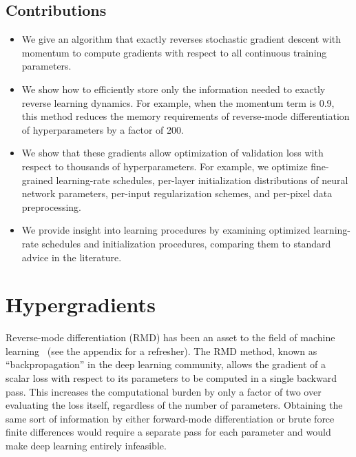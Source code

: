 \documentclass{article}
\begin{document}
\subsection{Contributions}

\begin{itemize}
\item We give an algorithm that exactly reverses stochastic gradient descent with momentum to compute gradients with respect to all continuous training parameters.
\item We show how to efficiently store only the information needed to exactly reverse learning dynamics.
For example, when the momentum term is 0.9, this method reduces the memory requirements of reverse-mode differentiation of hyperparameters by a factor of 200.
\item We show that these gradients allow optimization of validation loss with respect to thousands of hyperparameters.
For example, we optimize fine-grained learning-rate schedules, per-layer initialization distributions of neural network parameters, per-input regularization schemes, and per-pixel data preprocessing.
\item We provide insight into learning procedures by examining optimized learning-rate schedules and initialization procedures, comparing them to standard advice in the literature.
\end{itemize}

\section{Hypergradients}
\label{sec:hypergradients}

Reverse-mode differentiation (RMD) has been an asset to the field of machine
learning~\citep{lecun1989backpropagation} (see the appendix for a refresher). The RMD method, known as
``backpropagation'' in the deep learning community, allows the gradient of a
scalar loss with respect to its parameters to be computed in a single backward
pass.
This increases the computational burden by only a factor of two over
evaluating the loss itself, regardless of the number of parameters.
Obtaining the same sort of information by either forward-mode
differentiation or brute force finite differences would require a separate pass
for each parameter and would make deep learning entirely infeasible.
\end{document}
